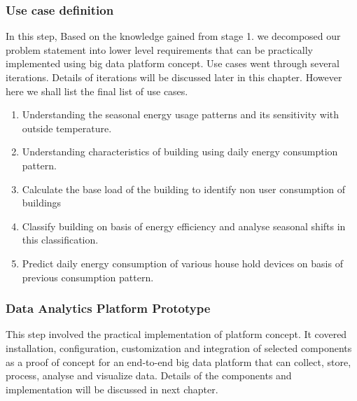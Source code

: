 \subsubsection{Use case definition} \label{usecases}
In this step, Based on the knowledge gained from stage 1. we decomposed our problem statement into lower level requirements that can be practically implemented using big data platform concept. Use cases went through several iterations. Details of iterations will be discussed later in this chapter. However here we shall list the final list of use cases.
\begin{enumerate}
\item Understanding the seasonal energy usage patterns and its sensitivity with outside temperature.
\item Understanding characteristics of building using daily energy consumption pattern.
\item Calculate the base load of the building to identify non user consumption of buildings
\item Classify building on basis of energy efficiency and analyse seasonal shifts in this classification.
\item Predict daily energy consumption of various house hold devices on basis of previous consumption pattern.
\end{enumerate}
\subsubsection{Data Analytics Platform Prototype}
This step involved the practical implementation of platform concept. It covered installation, configuration, customization and integration of selected components as a proof of concept for an end-to-end big data platform that can collect, store, process, analyse and visualize data. Details of the components and implementation will be discussed in next chapter.
